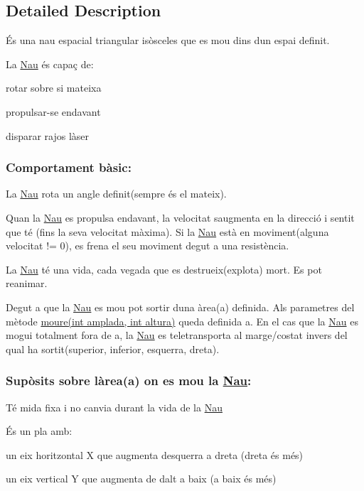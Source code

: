 \subsection{Detailed Description}
És una nau espacial triangular isòsceles que es mou dins d\textquotesingle{}un espai definit. 

La \hyperlink{class_nau}{Nau} és capaç de\+:
\begin{DoxyItemize}
\item rotar sobre si mateixa
\item propulsar-\/se endavant
\item disparar rajos làser
\end{DoxyItemize}

\subsubsection*{Comportament bàsic\+: }

La \hyperlink{class_nau}{Nau} rota un angle definit(sempre és el mateix).

Quan la \hyperlink{class_nau}{Nau} es propulsa endavant, la velocitat s\textquotesingle{}augmenta en la direcció i sentit que té (fins la seva velocitat màxima). Si la \hyperlink{class_nau}{Nau} està en moviment(alguna velocitat != 0), es frena el seu moviment degut a una resistència.

La \hyperlink{class_nau}{Nau} té una vida, cada vegada que es destrueix(explota) mort. Es pot reanimar.

Degut a que la \hyperlink{class_nau}{Nau} es mou pot sortir d\textquotesingle{}una àrea(a) definida. Als parametres del mètode \hyperlink{class_nau_a8dc46f91e02910b92bfad9b798f6552c}{moure(int amplada, int altura)} queda definida a. En el cas que la \hyperlink{class_nau}{Nau} es mogui totalment fora de a, la \hyperlink{class_nau}{Nau} es teletransporta al marge/costat invers del qual ha sortit(superior, inferior, esquerra, dreta).

\subsubsection*{Supòsits sobre l\textquotesingle{}àrea(a) on es mou la \hyperlink{class_nau}{Nau}\+: }

Té mida fixa i no canvia durant la vida de la \hyperlink{class_nau}{Nau}

És un pla amb\+:
\begin{DoxyItemize}
\item un eix horitzontal X que augmenta d\textquotesingle{}esquerra a dreta (dreta és més)
\item un eix vertical Y que augmenta de dalt a baix (a baix és més)
\end{DoxyItemize}

